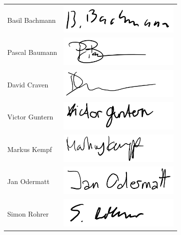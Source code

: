 \documentclass[a4paper]{report}
\begin{document}
\noindent
\begin{tabular}{lp{}}
	Basil Bachmann & \includegraphics[height=1.5cm,keepaspectratio]{BasilBachmann}\\
	Pascal Baumann & \includegraphics[height=1.5cm,keepaspectratio]{PascalBaumann}\\
	David Craven & \includegraphics[height=1.5cm,keepaspectratio]{DavidCraven}\\
	Victor Guntern & \includegraphics[height=1.5cm,keepaspectratio]{VictorGuntern}\\
	Markus Kempf & \includegraphics[height=1.5cm,keepaspectratio]{MarkusKempf}\\
	Jan Odermatt & \includegraphics[height=1.5cm,keepaspectratio]{JanOdermatt}\\
	Simon Rohrer &  \includegraphics[height=1.5cm,keepaspectratio]{SimonRohrer}\\
\end{tabular}

\newpage
\end{document}
